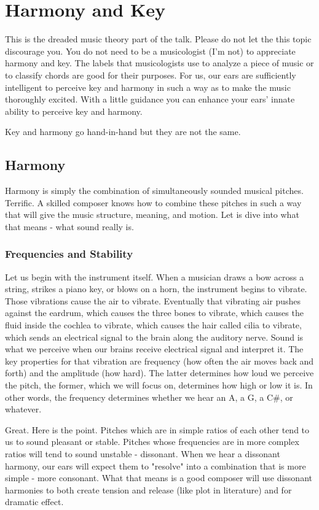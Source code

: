 \chapter{Harmony and Key}
This is the dreaded music theory part of the talk. Please do not let the this topic discourage you. You do not need to be a musicologist (I'm not) to appreciate harmony and key. The labels that musicologists use to analyze a piece of music or to classify chords are good for their purposes. For us, our ears are sufficiently intelligent to perceive key and harmony in such a way as to make the music thoroughly excited. With a little guidance you can enhance your ears' innate ability to perceive key and harmony.

Key and harmony go hand-in-hand but they are not the same.

\section{Harmony}
Harmony is simply the combination of simultaneously sounded musical pitches. Terrific. A skilled composer knows how to combine these pitches in such a way that will give the music structure, meaning, and motion. Let is dive into what that means - what sound really is.

\subsection{Frequencies and Stability}
Let us begin with the instrument itself. When a musician draws a bow across a string, strikes a piano key, or blows on a horn, the instrument begins to vibrate. Those vibrations cause the air to vibrate.  Eventually that vibrating air pushes against the eardrum, which causes the three bones to vibrate, which causes the fluid inside the cochlea to vibrate, which causes the hair called cilia to vibrate, which sends an electrical signal to the brain along the auditory nerve. Sound is what we perceive when our brains receive electrical signal and interpret it. The key properties for that vibration are frequency (how often the air moves back and forth) and the amplitude (how hard). The latter determines how loud we perceive the pitch, the former, which we will focus on, determines how high or low it is. In other words, the frequency determines whether we hear an A, a G, a C#, or whatever.


Great. Here is the point. Pitches which are in simple ratios of each other tend to us to sound pleasant or stable. Pitches whose frequencies are in more complex ratios will tend to sound unstable - dissonant.  %
When we hear a dissonant harmony, our ears will expect them to "resolve" into a combination that is more simple - more consonant. 
What that means is a good composer will use dissonant harmonies to both create tension and release (like plot in literature) and for dramatic effect.


